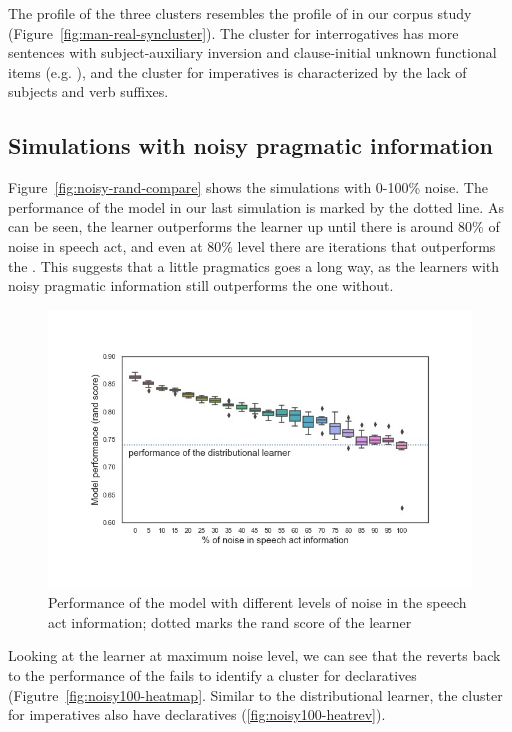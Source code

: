 The profile of the three clusters resembles the profile of \diis{} in our corpus study (Figure~\ref{fig:man-real-syncluster}). The cluster for interrogatives has more sentences with subject-auxiliary inversion and clause-initial unknown functional items (e.g. \twh{}), and the cluster for imperatives is characterized by the lack of subjects and verb suffixes. 

\subsection{Simulations with noisy pragmatic information}
\label{sec:mancl:model:results:noisy}

Figure~\ref{fig:noisy-rand-compare} shows the simulations with 0-100\% noise. The performance of the \dlearnerabbr{} model in our last simulation is marked by the dotted line. As can be seen, the \plearnerabbr{} learner outperforms the \dlearnerabbr{} learner up until there is around 80\% of noise in speech act, and even at 80\% level there are iterations that outperforms the \dlearnerabbr{}. This suggests that a little pragmatics goes a long way, as the learners with noisy pragmatic information still outperforms the one without. 

\begin{figure}[H]
    \centering
    \includegraphics[width=1\textwidth]{figures/noisy-rand-compare.jpg}
    \caption{Performance of the \plearnerabbr{} model with different levels of noise in the speech act information; dotted marks the rand score of the \dlearnerabbr{} learner}
    \label{fig:man-noisy-rand-compare}
\end{figure}


Looking at the learner at maximum noise level, we can see that the \plearnerabbr{} reverts back to the performance of the \dlearnerabbr{} fails to identify a cluster for declaratives (Figutre~\ref{fig:noisy100-heatmap}. Similar to the distributional learner, the cluster for imperatives also have declaratives (\ref{fig:noisy100-heatrev}). 



